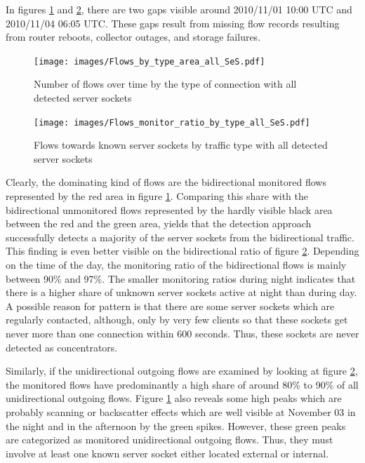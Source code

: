In figures \ref{fig:flows_by_type} and \ref{fig:monitored_flows_by_type}, there are two gaps visible around 2010/11/01 10:00 UTC and 2010/11/04 06:05 UTC. 
These gaps result from missing flow records resulting from router reboots, collector outages, and storage failures\citep{Schatzmann:Mining}.
\begin{figure}
	[ht] \centering 
	\texttt{[image: images/Flows\_by\_type\_area\_all\_SeS.pdf]} \caption{Number of flows over time by the type of connection with all detected server sockets} 
	\label{fig:flows_by_type} 
\end{figure}
\begin{figure}
	[h] \centering 
	\texttt{[image: images/Flows\_monitor\_ratio\_by\_type\_all\_SeS.pdf]} \caption{Flows towards known server sockets by traffic type with all detected server sockets} 
	\label{fig:monitored_flows_by_type} 
\end{figure}

Clearly, the dominating kind of flows are the bidirectional monitored flows represented by the red area in figure \ref{fig:flows_by_type}. 
Comparing this share with the bidirectional unmonitored flows represented by the hardly visible black area between the red and the green area, yields that the detection approach successfully detects a majority of the \glspl{server socket} from the bidirectional traffic. 
This finding is even better visible on the bidirectional ratio of figure \ref{fig:monitored_flows_by_type}. 
Depending on the time of the day, the monitoring ratio of the bidirectional flows is mainly between 90\% and 97\%. 
The smaller monitoring ratios during night indicates that there is a higher share of unknown \glspl{server socket} active at night than during day. 
A possible reason for pattern is that there are some \glspl{server socket} which are regularly contacted, although, only by very few clients so that these sockets get never more than one connection within 600 seconds. 
Thus, these sockets are never detected as concentrators.

Similarly, if the unidirectional outgoing flows are examined by looking at figure \ref{fig:monitored_flows_by_type}, the monitored flows have predominantly a high share of around 80\% to 90\% of all unidirectional outgoing flows. 
Figure \ref{fig:flows_by_type} also reveals some high peaks which are probably scanning or backscatter effects which are well visible at November 03 in the night and in the afternoon by the green spikes. 
However, these green peaks are categorized as monitored unidirectional outgoing flows. 
Thus, they must involve at least one known \gls{server socket} either located external or internal.

